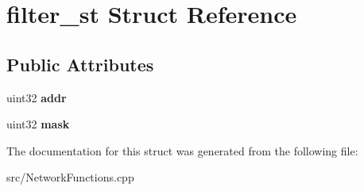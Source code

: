 \section{filter\_\-st Struct Reference}
\label{structfilter__st}
\subsection*{Public Attributes}
\begin{DoxyCompactItemize}
\item 
uint32 {\bfseries addr}\label{structfilter__st_ad17914f46635940a28131794f162e44a}

\item 
uint32 {\bfseries mask}\label{structfilter__st_a3d2a0b8cf02ac801a7a8f7e005a1450a}

\end{DoxyCompactItemize}


The documentation for this struct was generated from the following file:\begin{DoxyCompactItemize}
\item 
src/NetworkFunctions.cpp\end{DoxyCompactItemize}
